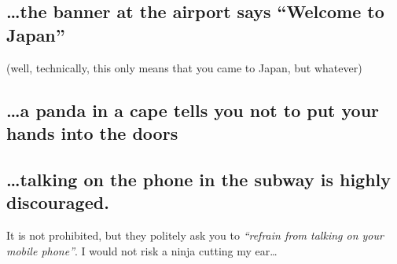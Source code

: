 \begin{post}
	\begin{content}	
\subsection{{\ldots}the banner at the airport says ``Welcome to Japan''}
(well, technically, this only means that you came to Japan, but whatever)	

\subsection{{\ldots}a panda in a cape tells you not to put your hands into the doors}
\begin{figure}[!h]
\centering
{}
\end{figure}

\subsection{{\ldots}talking on the phone in the subway is highly discouraged.}
It is not prohibited, but they politely ask you to \textit{``refrain from talking on your mobile phone''}. I would not risk a ninja cutting my ear\ldots


\end{content}
\end{post}
